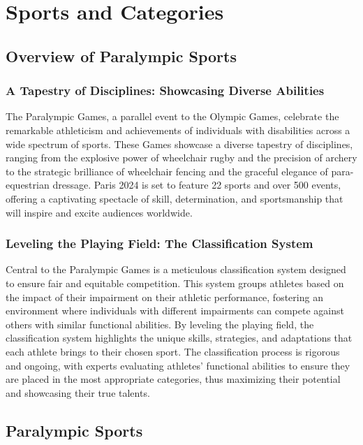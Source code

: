 \chapter{Sports and Categories}

\section{Overview of Paralympic Sports}

\subsection{A Tapestry of Disciplines: Showcasing Diverse Abilities}

The Paralympic Games, a parallel event to the Olympic Games, celebrate the remarkable athleticism and achievements of individuals with disabilities across a wide spectrum of sports.  These Games showcase a diverse tapestry of disciplines, ranging from the explosive power of wheelchair rugby and the precision of archery to the strategic brilliance of wheelchair fencing and the graceful elegance of para-equestrian dressage.  Paris 2024 is set to feature 22 sports and over 500 events, offering a captivating spectacle of skill, determination, and sportsmanship that will inspire and excite audiences worldwide.

\subsection{Leveling the Playing Field: The Classification System}

Central to the Paralympic Games is a meticulous classification system designed to ensure fair and equitable competition.  This system groups athletes based on the impact of their impairment on their athletic performance, fostering an environment where individuals with different impairments can compete against others with similar functional abilities. By leveling the playing field, the classification system highlights the unique skills, strategies, and adaptations that each athlete brings to their chosen sport. The classification process is rigorous and ongoing, with experts evaluating athletes' functional abilities to ensure they are placed in the most appropriate categories, thus maximizing their potential and showcasing their true talents.

\section{Paralympic Sports}






















